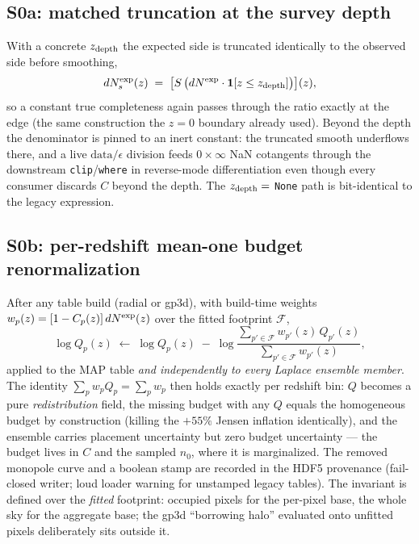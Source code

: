 \documentclass[11pt]{article}
\newcommand{\dNexp}{dN^{\rm exp}}
\newcommand{\dNexps}{dN^{\rm exp}_{s}}
\begin{document}
\subsection{S0a: matched truncation at the survey depth}

With a concrete $z_{\rm depth}$ the expected side is truncated identically to the
observed side before smoothing,
\begin{equation}
\dNexps(z) \;=\; \bigl[S\,\bigl(\dNexp \cdot \mathbf{1}[z \le z_{\rm depth}]\bigr)\bigr](z),
\end{equation}
so a constant true completeness again passes through the ratio exactly at the edge
(the same construction the $z=0$ boundary already used). Beyond the depth the
denominator is pinned to an inert constant: the truncated smooth underflows there,
and a live $\text{data}/\epsilon$ division feeds $0 \times \infty$ NaN cotangents
through the downstream \texttt{clip}/\texttt{where} in reverse-mode differentiation
even though every consumer discards $C$ beyond the depth. The $z_{\rm depth} = $
\texttt{None} path is bit-identical to the legacy expression.

\subsection{S0b: per-redshift mean-one budget renormalization}

After any table build (radial or gp3d), with build-time weights
$w_p(z) = [1 - C_p(z)]\,\dNexp(z)$ over the fitted footprint $\mathcal{F}$,
\begin{equation}
\log Q_p(z) \;\longleftarrow\; \log Q_p(z) \;-\;
\log \frac{\sum_{p' \in \mathcal{F}} w_{p'}(z)\, Q_{p'}(z)}
{\sum_{p' \in \mathcal{F}} w_{p'}(z)} ,
\label{eq:renorm}
\end{equation}
applied to the MAP table \emph{and independently to every Laplace ensemble member}.
The identity $\sum_p w_p Q_p = \sum_p w_p$ then holds exactly per redshift bin: $Q$
becomes a pure \emph{redistribution} field, the missing budget with any $Q$ equals
the homogeneous budget by construction (killing the $+55\%$ Jensen inflation
identically), and the ensemble carries placement uncertainty but zero budget
uncertainty --- the budget lives in $C$ and the sampled $n_0$, where it is
marginalized. The removed monopole curve and a boolean stamp are recorded in the
HDF5 provenance (fail-closed writer; loud loader warning for unstamped legacy
tables). The invariant is defined over the \emph{fitted} footprint: occupied pixels
for the per-pixel base, the whole sky for the aggregate base; the gp3d
``borrowing halo'' evaluated onto unfitted pixels deliberately sits outside it.
\end{document}
